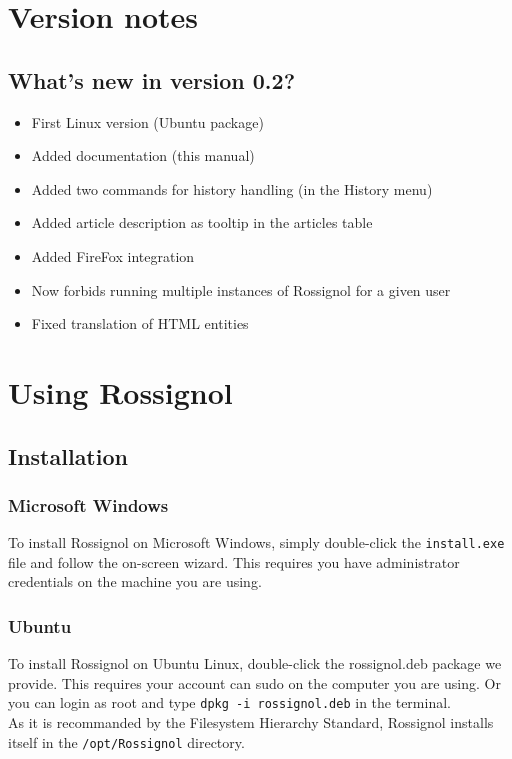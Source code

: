 \documentclass[11pt]{article} %
\begin{document}
\section{Version notes}
\subsection{What's new in version 0.2?}
\begin{itemize}
\item First Linux version (Ubuntu package)
\item Added documentation (this manual)
\item Added two commands for history handling (in the History menu)
\item Added article description as tooltip in the articles table
\item Added FireFox integration 
\item Now forbids running multiple instances of Rossignol for a given user 
\item Fixed translation of HTML entities
\end{itemize}

\section{Using Rossignol}
\subsection{Installation}
\subsubsection{Microsoft Windows}
To install Rossignol on Microsoft Windows, simply double-click the 
\texttt{install.exe}
file and follow the on-screen wizard. This requires you have administrator 
credentials on the machine you are using. 

\subsubsection{Ubuntu}
To install Rossignol on Ubuntu Linux, double-click the rossignol.deb package 
we provide. This requires your account can sudo on the computer you are using. 
Or you can login as root and type \texttt{dpkg -i rossignol.deb} in the terminal. 
\\
As it is recommanded by the Filesystem Hierarchy Standard, Rossignol installs 
itself in the \texttt{/opt/Rossignol} directory. 
\end{document}
